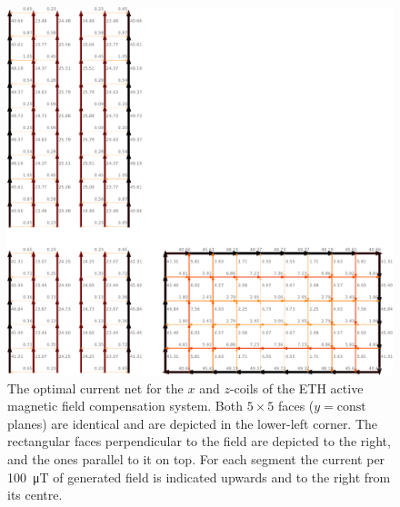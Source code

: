 \begin{figure}
  \centering
  \includegraphics[width=0.9\linewidth]{gfx/prototype/coil_design_x_100uT.pdf}
  \caption{The optimal current net for the $x$ and $z$-coils of the ETH active magnetic field compensation system. Both $5 \times 5$ faces ($y = \mathrm{const}$ planes) are identical and are depicted in the lower-left corner. The rectangular faces perpendicular to the field are depicted to the right, and the ones parallel to it on top. For each segment the current per \SI{100}{\micro\tesla} of generated field is indicated upwards and to the right from its centre.}\label{fig:prototype_coil_x_z_currents}
\end{figure}




